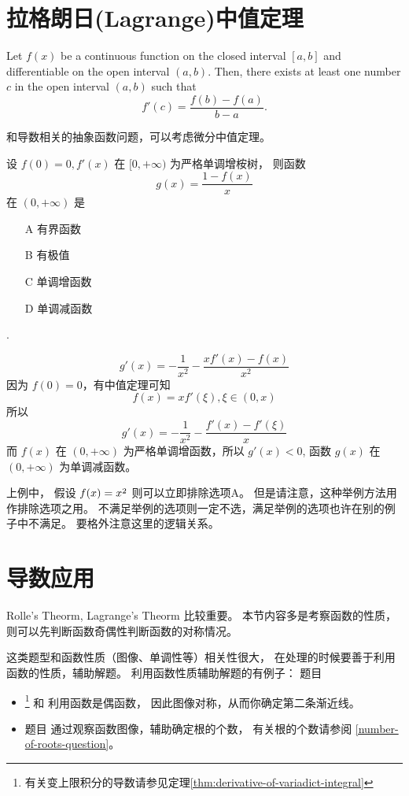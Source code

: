 \section{拉格朗日(Lagrange)中值定理}

\begin{definition}\label{thm:lagrange}
    Let $f(x)$ be a continuous function on the closed interval $[a, b]$ and differentiable on the open interval $(a, b)$. Then, there exists at least one number $c$ in the open interval $(a, b)$ such that
    \[f'(c) = \frac{f(b) - f(a)}{b - a}.\]
\end{definition}

和导数相关的抽象函数问题，可以考虑微分中值定理。

\begin{example}
    设 $f(0) = 0, f'(x)$ 在 $[0, + \infty)$ 为严格单调增桉树，
    则函数 \[g(x) = \dfrac{1 - f(x)}{x}\] 在 $(0, +\infty)$ 是
    \begin{itemize}
        \item[A] 有界函数
        \item[B] 有极值
        \item[C] 单调增函数
        \item[D] 单调减函数
    \end{itemize}

    \cite[question 157]{w660}.
    
    \[
        g'(x) = -\dfrac{1}{x^2} - \dfrac{xf'(x) - f(x)}{x^2}
    \]
    因为 $f(0) = 0$，有中值定理可知
    \[
        f(x) = xf'(\xi), \xi \in (0, x)
    \]
    所以
    \[
        g'(x) = -\dfrac{1}{x^2} - \dfrac{f'(x) - f'(\xi)}{x}
    \]
    而 $f(x)$ 在 $(0, +\infty)$ 为严格单调增函数，所以 $g'(x) < 0$, 
    函数 $g(x)$ 在 $(0, +\infty)$ 为单调减函数。
\end{example}
上例中， 假设 $f(x) = \cramped{x^2}$ 则可以立即排除选项A。
但是请注意，这种举例方法用作排除选项之用。
不满足举例的选项则一定不选，满足举例的选项也许在别的例子中不满足。
要格外注意这里的逻辑关系。 

\section{导数应用}

Rolle's Theorm, Lagrange's Theorm 比较重要。
本节内容多是考察函数的性质，则可以先判断函数奇偶性判断函数的对称情况。

这类题型和函数性质（图像、单调性等）相关性很大，
在处理的时候要善于利用函数的性质，辅助解题。
利用函数性质辅助解题的有例子：
题目 
\begin{itemize}

    \item   \cite[page 70, pdf 81, 例1]{we}\footnote{有关变上限积分的导数请参见定理\ref{thm:derivative-of-variadict-integral}} 和 
            \cite[page 75, pdf 86, 例5]{we}利用函数是偶函数，
            因此图像对称，从而你确定第二条渐近线。

    \item   题目 \cite[page 77, pdf 88, 例5, 例6]{we} 
            通过观察函数图像，辅助确定根的个数，
            有关根的个数请参阅 \ref{number-of-roots-question}。

\end{itemize}

